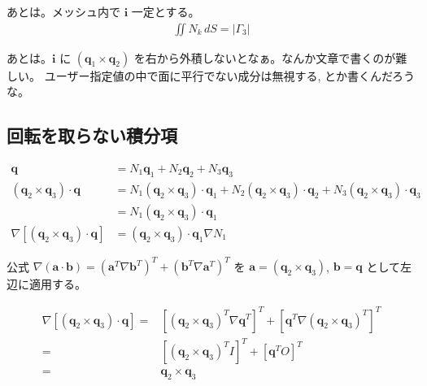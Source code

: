 あとは。メッシュ内で $\bm{i}$ 一定とする。
\begin{align}
\iint N_k\,dS = \left|\Gamma_3\right|
\end{align}

あとは。$\bm{i}$ に $\left(\bm{q}_1\times\bm{q}_2\right)$
を右から外積しないとなぁ。なんか文章で書くのが難しい。
ユーザー指定値の中で面に平行でない成分は無視する,
とか書くんだろうな。

\subsection{回転を取らない積分項}

\begin{align}
\bm{q}&=N_1\bm{q}_1+N_2\bm{q}_2+N_3\bm{q}_3\\
\left(\bm{q}_2\times\bm{q}_3\right)\cdot\bm{q}
&=N_1\left(\bm{q}_2\times\bm{q}_3\right)\cdot\bm{q}_1
 +N_2\left(\bm{q}_2\times\bm{q}_3\right)\cdot\bm{q}_2
 +N_3\left(\bm{q}_2\times\bm{q}_3\right)\cdot\bm{q}_3\\
&=N_1\left(\bm{q}_2\times\bm{q}_3\right)\cdot\bm{q}_1\\
\nabla\left[\left(\bm{q}_2\times\bm{q}_3\right)\cdot\bm{q}\right]
&=\left(\bm{q}_2\times\bm{q}_3\right)\cdot\bm{q}_1\nabla N_1
\end{align}

公式
$\nabla\left(\bm{a}\cdot\bm{b}\right)
=\left(\bm{a}^T\nabla\bm{b}^T\right)^T
+\left(\bm{b}^T\nabla\bm{a}^T\right)^T$
を
$\bm{a}=\left(\bm{q}_2\times\bm{q}_3\right)$,
$\bm{b}=\bm{q}$
として左辺に適用する。

\begin{align}
\nabla\left[\left(\bm{q}_2\times\bm{q}_3\right)\cdot\bm{q}\right]=
&\left[
\left(\bm{q}_2\times\bm{q}_3\right)^T\nabla\bm{q}^T
\right]^T
+\left[
\bm{q}^T\nabla\left(\bm{q}_2\times\bm{q}_3\right)^T
\right]^T\\
=
&\left[
\left(\bm{q}_2\times\bm{q}_3\right)^TI
\right]^T
+\left[
\bm{q}^TO
\right]^T\\
=&\bm{q}_2\times\bm{q}_3
\end{align}

